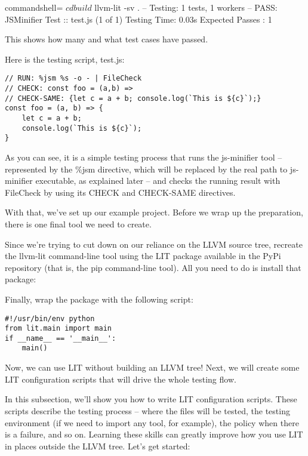 \begin{tcblisting}{commandshell={}}
$ cd build
$ llvm-lit -sv .
-- Testing: 1 tests, 1 workers –
PASS: JSMinifier Test :: test.js (1 of 1)
Testing Time: 0.03s
  Expected Passes : 1
\end{tcblisting}

This shows how many and what test cases have passed.

Here is the testing script, test.js:

\begin{lstlisting}[style=styleCMake]
// RUN: %jsm %s -o - | FileCheck
// CHECK: const foo = (a,b) =>
// CHECK-SAME: {let c = a + b; console.log(`This is ${c}`);}
const foo = (a, b) => {
	let c = a + b;
	console.log(`This is ${c}`);
}
\end{lstlisting}

As you can see, it is a simple testing process that runs the js-minifier tool – represented by the \%jsm directive, which will be replaced by the real path to js-minifier executable, as explained later – and checks the running result with FileCheck by using its CHECK and CHECK-SAME directives.

With that, we've set up our example project. Before we wrap up the preparation, there is one final tool we need to create.

Since we're trying to cut down on our reliance on the LLVM source tree, recreate the llvm-lit command-line tool using the LIT package available in the PyPi repository (that is, the pip command-line tool). All you need to do is install that package:


Finally, wrap the package with the following script:

\begin{lstlisting}[style=styleCMake]
#!/usr/bin/env python
from lit.main import main
if __name__ == '__main__':
	main()
\end{lstlisting}

Now, we can use LIT without building an LLVM tree! Next, we will create some LIT configuration scripts that will drive the whole testing flow.


In this subsection, we'll show you how to write LIT configuration scripts. These scripts describe the testing process – where the files will be tested, the testing environment (if we need to import any tool, for example), the policy when there is a failure, and so on. Learning these skills can greatly improve how you use LIT in places outside the LLVM tree. Let's get started:



















